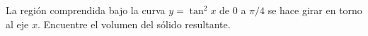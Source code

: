 \item La región comprendida bajo la curva $y = \tan^2 x$ de 0 a $\pi/4$ se hace girar en torno al eje $x$. Encuentre el volumen del sólido resultante.
